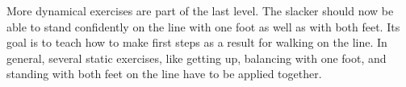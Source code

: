 More dynamical exercises are part of the last level.
The slacker should now be able to stand confidently on the line with one foot as well as with both feet.
Its goal is to teach how to make first steps as a result for walking on the line.
In general, several static exercises, like getting up, balancing with one foot, and standing with both feet on the line have to be applied together.
